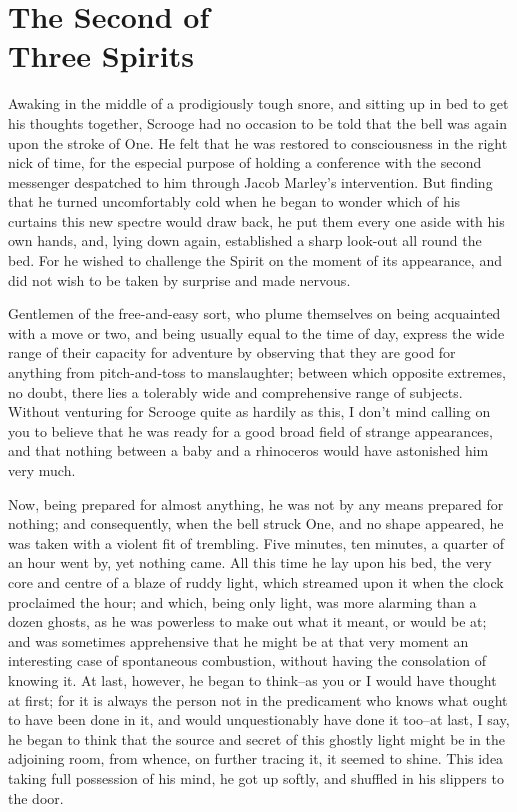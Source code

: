 \chapter{The Second of\\Three Spirits}
Awaking in the middle of a prodigiously tough snore, and sitting up in
bed to get his thoughts together, Scrooge had no occasion to be told
that the bell was again upon the stroke of One. He felt that he was
restored to consciousness in the right nick of time, for the especial
purpose of holding a conference with the second messenger despatched to
him through Jacob Marley's intervention. But finding that he turned
uncomfortably cold when he began to wonder which of his curtains this
new spectre would draw back, he put them every one aside with his own
hands, and, lying down again, established a sharp look-out all round the
bed. For he wished to challenge the Spirit on the moment of its
appearance, and did not wish to be taken by surprise and made nervous.

Gentlemen of the free-and-easy sort, who plume themselves on being
acquainted with a move or two, and being usually equal to the time of
day, express the wide range of their capacity for adventure by observing
that they are good for anything from pitch-and-toss to manslaughter;
between which opposite extremes, no doubt, there lies a tolerably wide
and comprehensive range of subjects. Without venturing for Scrooge quite
as hardily as this, I don't mind calling on you to believe that he was
ready for a good broad field of strange appearances, and that nothing
between a baby and a rhinoceros would have astonished him very much.

Now, being prepared for almost anything, he was not by any means
prepared for nothing; and consequently, when the bell struck One, and no
shape appeared, he was taken with a violent fit of trembling. Five
minutes, ten minutes, a quarter of an hour went by, yet nothing came.
All this time he lay upon his bed, the very core and centre of a blaze
of ruddy light, which streamed upon it when the clock proclaimed the
hour; and which, being only light, was more alarming than a dozen
ghosts, as he was powerless to make out what it meant, or would be at;
and was sometimes apprehensive that he might be at that very moment an
interesting case of spontaneous combustion, without having the
consolation of knowing it. At last, however, he began to think--as you
or I would have thought at first; for it is always the person not in the
predicament who knows what ought to have been done in it, and would
unquestionably have done it too--at last, I say, he began to think that
the source and secret of this ghostly light might be in the adjoining
room, from whence, on further tracing it, it seemed to shine. This idea
taking full possession of his mind, he got up softly, and shuffled in
his slippers to the door.

